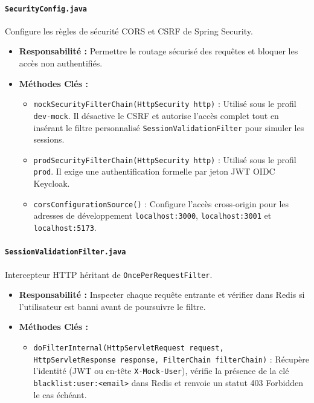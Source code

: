 \documentclass[12pt,a4paper]{article}
\begin{document}
\paragraph{\texttt{SecurityConfig.java}}
Configure les règles de sécurité CORS et CSRF de Spring Security.
\begin{itemize}
    \item \textbf{Responsabilité :} Permettre le routage sécurisé des requêtes et bloquer les accès non authentifiés.
    \item \textbf{Méthodes Clés :} 
        \begin{itemize}
            \item \texttt{mockSecurityFilterChain(HttpSecurity http)} : Utilisé sous le profil \texttt{dev-mock}. Il désactive le CSRF et autorise l'accès complet tout en insérant le filtre personnalisé \texttt{SessionValidationFilter} pour simuler les sessions.
            \item \texttt{prodSecurityFilterChain(HttpSecurity http)} : Utilisé sous le profil \texttt{prod}. Il exige une authentification formelle par jeton JWT OIDC Keycloak.
            \item \texttt{corsConfigurationSource()} : Configure l'accès cross-origin pour les adresses de développement \texttt{localhost:3000}, \texttt{localhost:3001} et \texttt{localhost:5173}.
        \end{itemize}
\end{itemize}

\paragraph{\texttt{SessionValidationFilter.java}}
Intercepteur HTTP héritant de \texttt{OncePerRequestFilter}.
\begin{itemize}
    \item \textbf{Responsabilité :} Inspecter chaque requête entrante et vérifier dans Redis si l'utilisateur est banni avant de poursuivre le filtre.
    \item \textbf{Méthodes Clés :} 
        \begin{itemize}
            \item \texttt{doFilterInternal(HttpServletRequest request, HttpServletResponse response, FilterChain filterChain)} : Récupère l'identité (JWT ou en-tête \texttt{X-Mock-User}), vérifie la présence de la clé \texttt{blacklist:user:<email>} dans Redis et renvoie un statut 403 Forbidden le cas échéant.
        \end{itemize}
\end{itemize}
\end{document}
